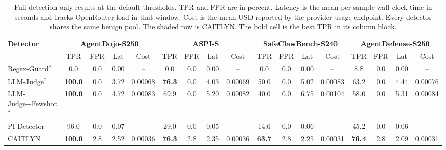 \begin{table}[tp!]
  \centering
  \scriptsize
  \setlength{\tabcolsep}{4pt}
  \renewcommand{\arraystretch}{1.18}
  \caption[Full detection-only results at the default thresholds.]{%
    Full detection-only results at the default thresholds.
    TPR and FPR are in percent. Latency is the mean per-sample
    wall-clock time in seconds and tracks OpenRouter load in that
    window. Cost is the mean USD reported by the provider usage
    endpoint. Every detector shares the same benign pool.
    The shaded row is CAITLYN. The bold cell is the best TPR in
    its column block.
  }
  \label{tab:appendix-detection-full}
  \begin{tabular}{@{}l*{4}{cccc}@{}}
    \toprule
    \textbf{Detector}
    & \multicolumn{4}{c}{\textbf{AgentDojo-S250}}
    & \multicolumn{4}{c}{\textbf{ASPI-S}}
    & \multicolumn{4}{c}{\textbf{SafeClawBench-S240}}
    & \multicolumn{4}{c}{\textbf{AgentDefense-S250}} \\
    \cmidrule(lr){2-5}\cmidrule(lr){6-9}\cmidrule(lr){10-13}\cmidrule(lr){14-17}
    & TPR & FPR & Lat & Cost & TPR & FPR & Lat & Cost
    & TPR & FPR & Lat & Cost & TPR & FPR & Lat & Cost \\
    \midrule
    Regex-Guard$^{*}$    & 0.0 & 0.0 & 0.00 & -- & 0.0 & 0.0 & 0.00 & -- & 0.0 & 0.0 & 0.00 & -- & 8.8 & 0.0 & 0.00 & -- \\
    LLM-Judge$^{*}$      & \textbf{100.0} & 0.0 & 3.72 & 0.00068 & \textbf{76.3} & 0.0 & 4.03 & 0.00069 & 50.0 & 0.0 & 5.02 & 0.00083 & 63.2 & 0.0 & 4.44 & 0.00076 \\
    LLM-Judge+Fewshot$^{*}$ & \textbf{100.0} & 0.0 & 4.72 & 0.00083 & 69.9 & 0.0 & 5.20 & 0.00082 & 40.0 & 0.0 & 6.75 & 0.00104 & 58.0 & 0.0 & 5.31 & 0.00084 \\
    PI Detector          & 96.0 & 0.0 & 0.07 & -- & 29.0 & 0.0 & 0.05 & -- & 14.6 & 0.0 & 0.06 & -- & 45.2 & 0.0 & 0.06 & -- \\
    CAITLYN     & \textbf{100.0} & 2.8 & 2.52 & 0.00036 & \textbf{76.3} & 2.8 & 2.35 & 0.00036 & \textbf{63.7} & 2.8 & 2.25 & 0.00031 & \textbf{76.4} & 2.8 & 2.09 & 0.00031 \\
    \bottomrule
  \end{tabular}
\end{table}
